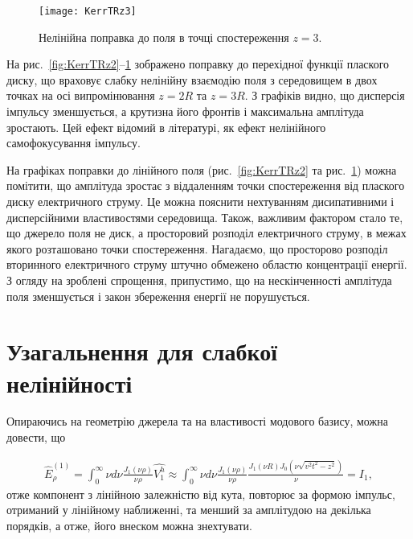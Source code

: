 \begin{figure}[htbp] \begin{center}
\texttt{[image: KerrTRz3]}
\caption{Нелінійна поправка до поля в точці спостереження $ z = 3 $.} 
\label{fig:KerrTRz3}
\end{center} \end{figure}

На рис.~\ref{fig:KerrTRz2}--\ref{fig:KerrTRz3} зображено поправку
до перехідної функції плаского диску, що враховує слабку нелінійну взаємодію 
поля з середовищем в двох точках на осі випромінювання $ z = 2R $ та $ z = 3R $.
З графіків видно, що дисперсія імпульсу зменшується, а крутизна його фронтів і
максимальна амплітуда зростають. Цей ефект відомий в літературі, як ефект 
нелінійного самофокусування імпульсу.

На графіках поправки до лінійного поля (рис.~\ref{fig:KerrTRz2} та 
рис.~\ref{fig:KerrTRz3}) можна помітити, що амплітуда зростає з віддаленням 
точки спостереження від плаского диску електричного струму. Це можна 
пояснити нехтуванням дисипативними і дисперсійними властивостями 
середовища. Також, важливим фактором стало те, що джерело поля не диск, 
а просторовий розподіл електричного струму, в межах якого розташовано точки 
спостереження. Нагадаємо, що просторово розподіл вторинного електричного 
струму штучно обмежено областю концентрації енергії. З огляду на зроблені 
спрощення, припустимо, що на нескінченності амплітуда поля зменшується і 
закон збереження енергії не порушується.

\section{Узагальнення для слабкої нелінійності}

Опираючись на геометрію джерела та на властивості модового базису, можна 
довести, що 

\begin{equation} \begin{aligned}
\hat{E}_\rho^{(1)} = \int_0^\infty \nu d \nu 
\frac{J_1(\nu \rho)}{\nu \rho} \hat{V_1^h} \approx
\int_0^\infty \nu d \nu \frac{J_1(\nu \rho)}{\nu \rho} 
\frac{J_1(\nu R) J_0(\nu \sqrt{v^2t^2-z^2})}{\nu} = I_1,
\end{aligned} \end{equation}
%
отже компонент з лінійною залежністю від кута, повторює за формою 
імпульс, отриманий у лінійному наближенні, та менший за амплітудою на 
декілька порядків, а отже, його внеском можна знехтувати.

